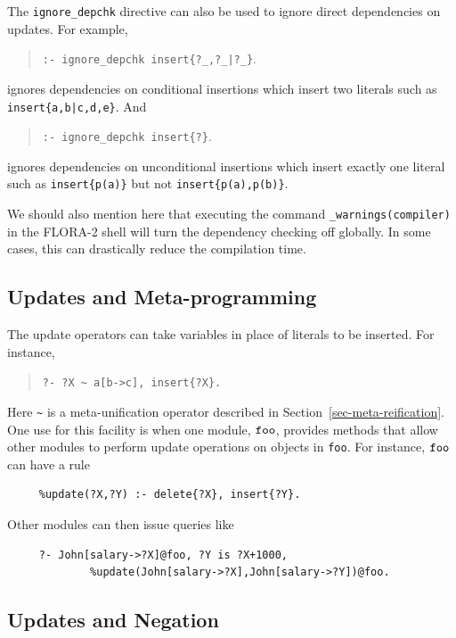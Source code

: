 \documentclass[11pt]{article}
\begin{document}
The {\tt ignore\_depchk} directive can also be used to ignore direct
dependencies on updates. For example, 
\begin{quote}
{\tt :- ignore\_depchk insert\{?\_,?\_|?\_\}}.
\end{quote}
\noindent ignores dependencies on conditional insertions which insert
two literals such as {\tt insert\{a,b|c,d,e\}}. And
\begin{quote}
{\tt :- ignore\_depchk insert\{?\}}.
\end{quote}
\noindent ignores dependencies on unconditional insertions which insert
exactly one literal such as {\tt insert\{p(a)\}} but not {\tt insert\{p(a),p(b)\}}. 

We should also mention here that executing the command
\texttt{\_warnings(compiler)} in the FLORA-2 shell will turn the dependency
checking off globally. In some cases, this can drastically
reduce the compilation time.



\subsection{Updates and Meta-programming}

The update operators can take variables in place of literals to be
inserted.  For instance,
\begin{quote}
 {\tt ?-  ?X \verb|~| a[b->c], insert\{?X\}.}
\end{quote}
  Here \verb|~| is a meta-unification operator described in
  Section~\ref{sec-meta-reification}.
One use for this facility is when one module, $\tt foo$, provides methods that
allow other modules to perform update operations on objects in {\tt foo}.
For instance, $\tt foo$ can have a rule
\begin{verbatim}
     %update(?X,?Y) :- delete{?X}, insert{?Y}.
\end{verbatim}
Other modules can then issue queries like
\begin{verbatim}
     ?- John[salary->?X]@foo, ?Y is ?X+1000,
             %update(John[salary->?X],John[salary->?Y])@foo.  
\end{verbatim}

\subsection{Updates and Negation}
\end{document}
